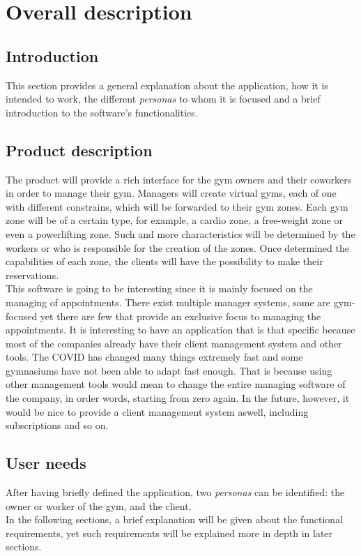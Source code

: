 \documentclass[a4paper, 12pt, oneside]{book}
\begin{document}
\section{Overall description}
\subsection{Introduction}
This section provides a general explanation about the application, how it is intended to work, the different \emph{personas} to whom it is focused and a brief introduction to the software's functionalities.
\subsection{Product description}
The product will provide a rich interface for the gym owners and their coworkers in order to manage their gym. Managers will create virtual gyms, each of one with different constrains, which will be forwarded to their gym zones. Each gym zone will be of a certain type, for example, a cardio zone, a free-weight zone or even a powerlifting zone. Such and more characteristics will be determined by the workers or who is responsible for the creation of the zones. Once determined the capabilities of each zone, the clients will have the possibility to make their reservations.
\\[8pt]
This software is going to be interesting since it is mainly focused on the managing of appointments. There exist multiple manager systems, some are gym-focused yet there are few that provide an exclusive focus to managing the appointments. It is interesting to have an application that is that specific because most of the companies already have their client management system and other tools. The COVID has changed many things extremely fast and some gymnasiums have not been able to adapt fast enough. That is because using other management tools would mean to change the entire managing software of the company, in order words, starting from zero again. In the future, however, it would be nice to provide a client management system aswell, including subscriptions and so on.
\subsection{User needs}
After having briefly defined the application, two \emph{personas} can be identified: the owner or worker of the gym, and the client.
\\[8pt]
In the following sections, a brief explanation will be given about the functional requirements, yet such requirements will be explained more in depth in later sections.
\end{document}
